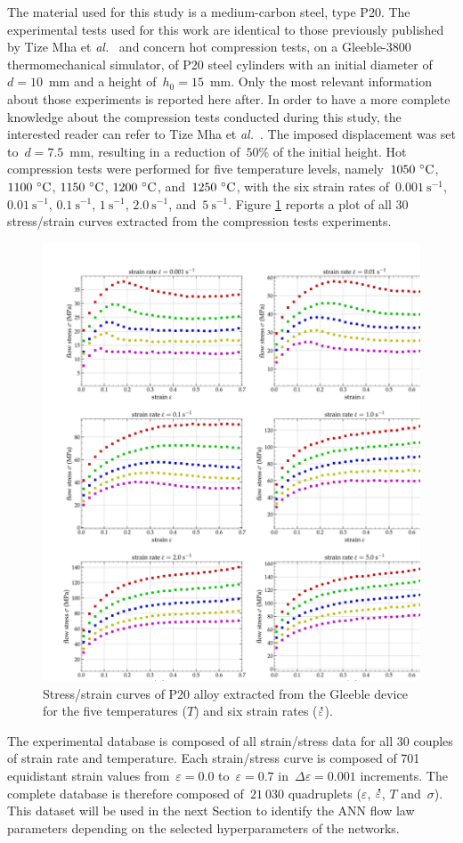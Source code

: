 \documentclass[algorithms,article,submit,pdftex,oneauthors]{Definitions/mdpi}
\makeatletter
\DeclareRobustCommand{\mdot}[1]{\accentset{\mbox{\bfseries .}}{#1}}
\DeclareRobustCommand{\eal}{et \emph{al.}\@\xspace}
\DeclareRobustCommand{\ps}{\text{s}^{-1}}
\makeatother
\begin{document}
The material used for this study is a medium-carbon steel, type P20.
The experimental tests used for this work are identical to those previously published by Tize Mha \eal~\cite{Tize-2023-IEP} and concern hot compression tests, on a Gleeble-3800 thermomechanical simulator, of P20 steel cylinders with an initial diameter of~$d=10$~mm and a height of~$h_0=15$~mm.
Only the most relevant information about those experiments is reported here after.
In order to have a more complete knowledge about the compression tests conducted during this study, the interested reader can refer to Tize Mha \eal~\cite{Tize-2023-IEP}.
The imposed displacement was set to~$d=7.5$~mm, resulting in a reduction of~$50\%$ of the initial height.
Hot compression tests were performed for five temperature levels, namely~$1050~\celsius$, $1100~\celsius$, $1150~\celsius$, $1200~\celsius$, and~$1250~\celsius$, with the six strain rates of~$0.001~\ps$, $0.01~\ps$, $0.1~\ps$, $1~\ps$, $2.0~\ps$, and~$5~\ps$.
Figure \ref{fig:RawData} reports a plot of all 30 stress/strain curves extracted from the compression tests experiments.
\begin{figure}[h]
\centering
\includegraphics[width=0.9\columnwidth]{Figures/3Cr2Mo-raw}
\caption{Stress/strain curves of P20 alloy extracted from the Gleeble device for the five temperatures ($T$) and six strain rates ($\mdot{\varepsilon}$).}
\label{fig:RawData}
\end{figure}
The experimental database is composed of all strain/stress data for all 30 couples of strain rate and temperature.
Each strain/stress curve is composed of 701 equidistant strain values from~$\varepsilon=0.0$ to~$\varepsilon=0.7$ in~$\Delta\varepsilon=0.001$ increments.
The complete database is therefore composed of~$21~030$ quadruplets ($\varepsilon$, $\mdot{\varepsilon}$, $T$ and~$\sigma$).
This dataset will be used in the next Section to identify the ANN flow law parameters depending on the selected hyperparameters of the networks.
\end{document}
